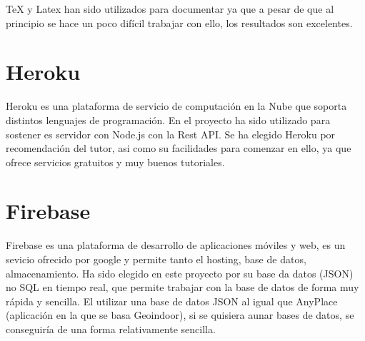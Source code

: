 \TeX{} y Latex han sido utilizados para documentar ya que a pesar de que al principio se hace un poco difícil trabajar con ello, los resultados son excelentes.

\section{Heroku}\label{Heroku}

Heroku es una plataforma de servicio de computación en la Nube que soporta distintos lenguajes de programación.
En el proyecto ha sido utilizado para sostener es servidor con Node.js con la Rest API. Se ha elegido Heroku por recomendación del tutor, asi como su facilidades para comenzar en ello, ya que ofrece servicios gratuitos y muy buenos tutoriales.

\section{Firebase}\label{Firebase}

Firebase es una plataforma de desarrollo de aplicaciones móviles y web, es un sevicio ofrecido por google y permite tanto el hosting, base de datos, almacenamiento. Ha sido elegido en este proyecto por su base da datos (JSON) no SQL en tiempo real, que permite trabajar con la base de datos de forma muy rápida y sencilla. El utilizar una base de datos JSON al igual que AnyPlace (aplicación en la que se basa Geoindoor), si se quisiera aunar bases de datos, se conseguiría de una forma relativamente sencilla.


